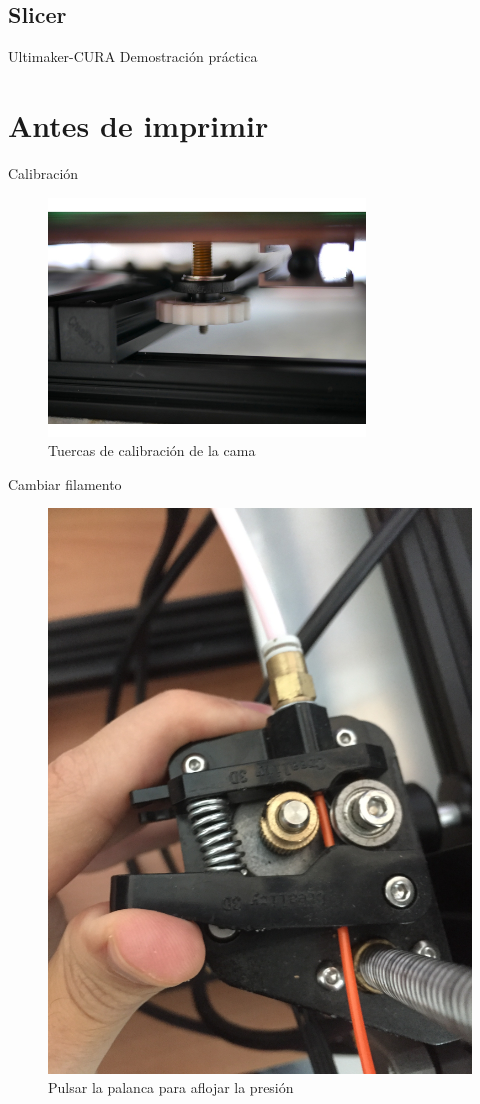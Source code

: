 \documentclass{beamer}
\begin{document}
	\subsection{Slicer}
	\begin{frame}[standout]{Ultimaker-CURA}
		Demostración práctica
	\end{frame}
	
	\section{Antes de imprimir}
	\begin{frame}{Calibración}
		\begin{figure}
			\includegraphics[width=0.75\textwidth]{images/bed_knob}
			\caption{Tuercas de calibración de la cama}
		\end{figure}
	\end{frame}
	\begin{frame}{Cambiar filamento}
		\begin{figure}
			\includegraphics[width=.75\textwidth]{images/cambiar_filamento}
			\caption{Pulsar la palanca para aflojar la presión}
		\end{figure}
	\end{frame}
\end{document}
